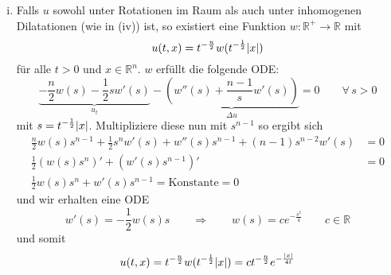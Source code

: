 \begin{enumerate}[(i)]
	\item Falls $u$ sowohl unter Rotationen im Raum als auch unter inhomogenen Dilatationen (wie in (iv)) ist, so existiert eine Funktion $w: \mathbb{R}^+ \to \mathbb{R}$ mit
	\[
		u(t,x)= t^{- \frac{n}{2}} w(t^{- \frac{1}{2}} \lvert x\rvert)
	\]
	für alle $t >0$ und $x \in \mathbb{R}^n$. $w$ erfüllt die folgende ODE:
	\[
		\underset{u_t}{\underbrace{-\frac{n}{2} w(s)- \frac{1}{2} s w'(s)}} - \underset{\Delta u}{\underbrace{\left( w''(s) + \frac{n-1}{s} w'(s) \right)}} 
		= 0 \qquad \forall\, s >0 
	\]
	mit $s = t^{- \frac{1}{2}} \lvert x\rvert$. Multipliziere diese nun mit $s^{n-1}$ so ergibt sich
	\begin{align*}
		 \frac{n}{2} w(s) s^{n-1} + \frac{1}{2} s^n w'(s) + w''(s) s^{n-1} + (n-1) s^{n-2} w'(s) &= 0 \\
		\frac{1}{2} \left( w(s) s^n \right)' + \left( w'(s) s^{n-1} \right)' &=0  \\
		\frac{1}{2} w(s) s^n + w'(s) s^{n-1} = \text{Konstante} = 0
	\end{align*}
	und wir erhalten eine ODE
	\[
		w'(s) = -\frac{1}{2}w(s)s \qquad \Rightarrow \qquad w(s) = c e^{-\frac{s^2}{4}} \qquad c \in \mathbb{R}
	\]
	und somit
	\[
		u(t,x) = t^{- \frac{n}{2}} w(t^{- \frac{1}{2}} \lvert x\rvert) = c t^{- \frac{n}{2}} e^{- \frac{\lvert x\rvert}{4t}}
	\]
\end{enumerate}

